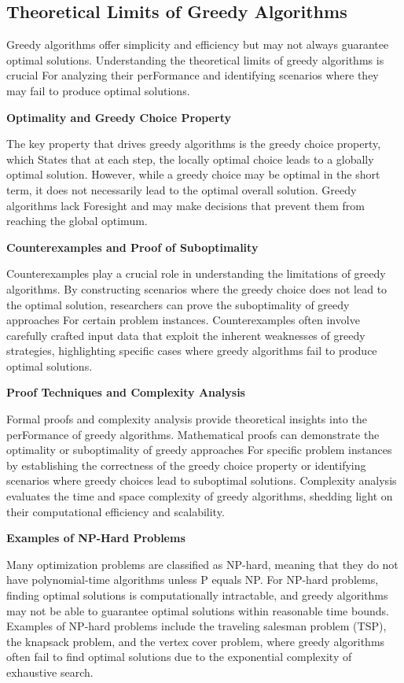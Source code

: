 \documentclass[12pt]{book} %
\begin{document}
\subsection{Theoretical Limits of Greedy Algorithms}
Greedy algorithms offer simplicity and efficiency but may not always guarantee optimal solutions. Understanding the theoretical limits of greedy algorithms is crucial For analyzing their perFormance and identifying scenarios where they may fail to produce optimal solutions.

\textbf{Optimality and Greedy Choice Property}

The key property that drives greedy algorithms is the greedy choice property, which States that at each step, the locally optimal choice leads to a globally optimal solution. However, while a greedy choice may be optimal in the short term, it does not necessarily lead to the optimal overall solution. Greedy algorithms lack Foresight and may make decisions that prevent them from reaching the global optimum.

\textbf{Counterexamples and Proof of Suboptimality}

Counterexamples play a crucial role in understanding the limitations of greedy algorithms. By constructing scenarios where the greedy choice does not lead to the optimal solution, researchers can prove the suboptimality of greedy approaches For certain problem instances. Counterexamples often involve carefully crafted input data that exploit the inherent weaknesses of greedy strategies, highlighting specific cases where greedy algorithms fail to produce optimal solutions.

\textbf{Proof Techniques and Complexity Analysis}

Formal proofs and complexity analysis provide theoretical insights into the perFormance of greedy algorithms. Mathematical proofs can demonstrate the optimality or suboptimality of greedy approaches For specific problem instances by establishing the correctness of the greedy choice property or identifying scenarios where greedy choices lead to suboptimal solutions. Complexity analysis evaluates the time and space complexity of greedy algorithms, shedding light on their computational efficiency and scalability.

\textbf{Examples of NP-Hard Problems}

Many optimization problems are classified as NP-hard, meaning that they do not have polynomial-time algorithms unless P equals NP. For NP-hard problems, finding optimal solutions is computationally intractable, and greedy algorithms may not be able to guarantee optimal solutions within reasonable time bounds. Examples of NP-hard problems include the traveling salesman problem (TSP), the knapsack problem, and the vertex cover problem, where greedy algorithms often fail to find optimal solutions due to the exponential complexity of exhaustive search.
\end{document}
